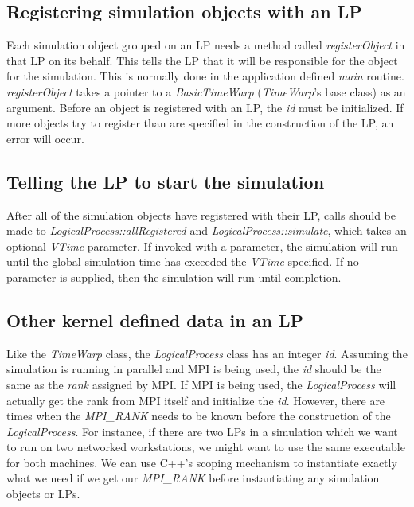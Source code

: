 \documentclass[11pt]{report}
\begin{document}
\subsection{Registering simulation objects with an LP}

Each simulation object grouped on an LP needs a method called {\it
registerObject} in that LP on its behalf.  This tells the LP that it will
be responsible for the object for the simulation.  This is normally done
in the application defined {\it main} routine.  {\it registerObject} takes
a pointer to a {\it BasicTimeWarp} ({\it TimeWarp}'s base class) as an
argument.  Before an object is registered with an LP, the {\it id} must be
initialized.  If more objects try to register than are specified in the
construction of the LP, an error will occur.

\subsection{Telling the LP to start the simulation}

After all of the simulation objects have registered with their LP, calls
should be made to {\it LogicalProcess::allRegistered} and {\it
LogicalProcess::simulate}, which takes an optional {\it VTime} parameter.
If invoked with a parameter, the simulation will run until the global
simulation time has exceeded the {\it VTime} specified.  If no parameter
is supplied, then the simulation will run until completion.

\subsection{Other kernel defined data in an LP}

Like the {\it TimeWarp} class, the {\it LogicalProcess} class has an
integer {\it id}.  Assuming the simulation is running in parallel and MPI
is being used, the {\it id} should be the same as the {\it rank} assigned
by MPI.  If MPI is being used, the {\it LogicalProcess} will actually get
the rank from MPI itself and initialize the {\it id}.  However, there are
times when the {\it MPI\_RANK} needs to be known before the construction of
the {\it LogicalProcess}.  For instance, if there are two LPs in a
simulation which we want to run on two networked workstations, we might
want to use the same executable for both machines.  We can use C++'s
scoping mechanism to instantiate exactly what we need if we get our {\it
MPI\_RANK} before instantiating any simulation objects or LPs.
\end{document}
